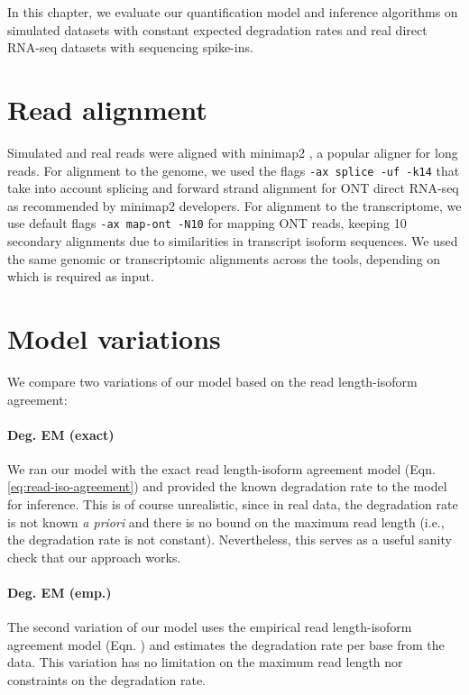 
In this chapter, we evaluate our quantification model and inference algorithms on simulated datasets with constant expected degradation rates and real direct RNA-seq datasets with sequencing spike-ins. 

\section{Read alignment}

Simulated and real reads were aligned with minimap2 \cite{Minimap2018, Minimap2021}, a popular aligner for long reads. For alignment to the genome, we used the flags \texttt{-ax splice -uf -k14} that take into account splicing and forward strand alignment for ONT direct RNA-seq as recommended by minimap2 developers. For alignment to the transcriptome, we use default flags \texttt{-ax map-ont -N10} for mapping ONT reads, keeping 10 secondary alignments due to similarities in transcript isoform sequences. We used the same genomic or transcriptomic alignments across the tools, depending on which is required as input.   

\section{Model variations}

We compare two variations of our model based on the read length-isoform agreement:

\paragraph{Deg. EM (exact)} We ran our model with the exact read length-isoform agreement model (Eqn. \ref{eq:read-iso-agreement}) and provided the known degradation rate to the model for inference. This is of course unrealistic, since in real data, the degradation rate is not known \textit{a priori} and there is no bound on the maximum read length (i.e., the degradation rate is not constant). Nevertheless, this serves as a useful sanity check that our approach works. 

\paragraph{Deg. EM (emp.)} The second variation of our model uses the empirical read length-isoform agreement model (Eqn. ) and estimates the degradation rate per base from the data. This variation has no limitation on the maximum read length nor constraints on the degradation rate. 

